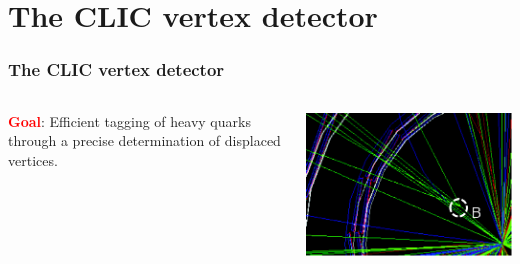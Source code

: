 \section{The CLIC vertex detector}
\begin{frame}
  \frametitle{}
  \tableofcontents[currentsection]
\end{frame}
\begin{frame}
  \frametitle{The CLIC vertex detector}

  \begin{columns}
    \textcolor{Red}{\textbf{Goal}}: Efficient tagging of heavy quarks
    through a precise determination of displaced vertices.


    \centering
    \includegraphics[width=\textwidth]{figures/secondary_vertex.png}
  \end{columns}



  \begin{columns}


\end{columns}
\end{frame}
